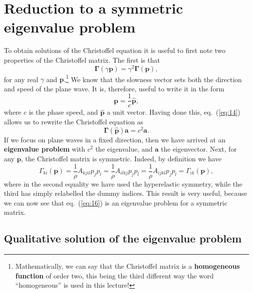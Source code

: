 \section*{Reduction to a symmetric eigenvalue problem}

To obtain solutions of the Christoffel equation it is useful to first note two properties of the Christoffel matrix. The first is that
\begin{equation}
\bm{\Gamma}(\gamma \mathbf{p})=\gamma^{2}\bm{\Gamma}(\mathbf{p}),
\label{eq:14}
\end{equation}
for any real $\gamma$ and $\mathbf{p}$.\footnote{Mathematically, we can say that the Christoffel matrix is a \textbf{homogeneous function} of order two, 
this being the third different way the word ``homogeneous'' is used in this lecture!} We know that the slowness vector sets both the direction and speed of the plane wave. It is, therefore, useful to write it in the form
\begin{equation}
\mathbf{p}=\frac{1}{c}\hat{\mathbf{p}}, 
\label{eq:15}
\end{equation}
where $c$ is the phase speed, and $\hat{\mathbf{p}}$ a unit vector. Having done this, eq.~(\ref{eq:14}) allows us to rewrite the Christoffel equation as
\begin{equation}
\bm{\Gamma}(\hat{\mathbf{p}})\mathbf{a}=c^{2}\mathbf{a}.
\label{eq:16}
\end{equation}
If we focus on plane waves in a fixed direction, then we have arrived at an \textbf{eigenvalue problem} with $c^{2}$ the eigenvalue, 
and $\mathbf{a}$ the eigenvector. Next, for any $\mathbf{p}$, the Christoffel matrix is symmetric. Indeed, by definition we have
\begin{equation}
\Gamma_{ki}(\mathbf{p})=\frac{1}{\rho}A_{kjil}p_{j}p_{l}=\frac{1}{\rho}A_{ilkj}p_{j}p_{l}=\frac{1}{\rho}A_{ijkl}p_{j}p_{l}=\Gamma_{ik}(\mathbf{p}),
\label{eq:17}
\end{equation}
where in the second equality we have used the hyperelastic symmetry, while the third has simply relabelled the dummy indices. 
This result is very useful, because we can now see that eq.~(\ref{eq:16}) is an eigenvalue problem for a symmetric matrix.

\subsection*{Qualitative solution of the eigenvalue problem}

